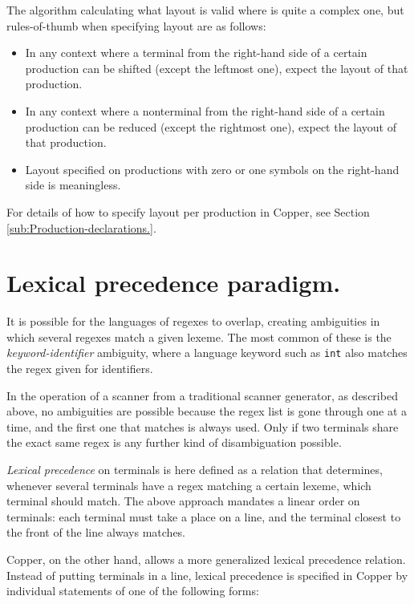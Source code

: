 \documentclass[12pt,english,twoside]{report}
\newcommand\sectionname{Section}
\begin{document}
The algorithm calculating what layout is valid where is quite a complex
one, but rules-of-thumb when specifying layout are as follows:

\begin{itemize}
\item In any context where a terminal from the right-hand side of a certain
production can be shifted (except the leftmost one), expect the layout
of that production.
\item In any context where a nonterminal from the right-hand side of a certain
production can be reduced (except the rightmost one), expect the layout
of that production.
\item Layout specified on productions with zero or one symbols on the right-hand
side is meaningless.
\end{itemize}
For details of how to specify layout per production in Copper, see
\sectionname{} \ref{sub:Production-declarations.}.


\section{\label{sec:Lexical-precedence-paradigm.}Lexical precedence paradigm.}

It is possible for the languages of regexes to overlap, creating ambiguities
in which several regexes match a given lexeme. The most common of
these is the \emph{keyword-identifier} ambiguity, where a language
keyword such as \texttt{int} also matches the regex given for identifiers.

In the operation of a scanner from a traditional scanner generator,
as described above, no ambiguities are possible because the regex
list is gone through one at a time, and the first one that matches
is always used. Only if two terminals share the exact same regex is
any further kind of disambiguation possible.

\emph{Lexical precedence} on terminals is here defined as a relation
that determines, whenever several terminals have a regex matching
a certain lexeme, which terminal should match. The above approach
mandates a linear order on terminals: each terminal must take a place
on a line, and the terminal closest to the front of the line always
matches.

Copper, on the other hand, allows a more generalized lexical precedence
relation. Instead of putting terminals in a line, lexical precedence
is specified in Copper by individual statements of one of the following
forms:
\end{document}
